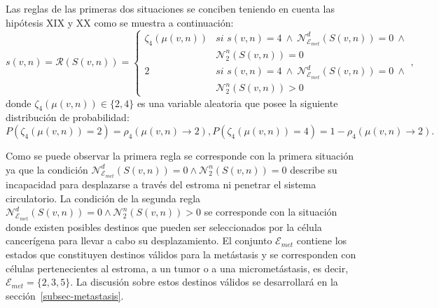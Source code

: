 Las reglas de las primeras dos situaciones se conciben teniendo en cuenta las hip\'otesis XIX y XX como se muestra a continuaci\'on:
\begin{equation}
s(v,n)=\mathcal{R}(S(v,n))=\left\lbrace
	\begin{array}{cl}
		\zeta_4(\mu(v,n)) & \textit{si } s(v,n)=4~\wedge~\mathcal{N}_{\mathcal{E}_{met}}^d(S(v,n))=0~\wedge\\
				          & \mathcal{N}_2^n(S(v,n))=0\\
		2& \textit{si } s(v,n)=4~\wedge~\mathcal{N}_{\mathcal{E}_{met}}^d(S(v,n))=0~\wedge\\
		 & \mathcal{N}_2^n(S(v,n))>0		
	\end{array}
\right., \label{eq-aparition}
\end{equation}
donde $\zeta_4(\mu(v,n)) \in \lbrace 2,4 \rbrace$ es una variable aleatoria que posee la siguiente distribuci\'on de probabilidad:
\begin{subequations}
\begin{equation}
P(\zeta_4(\mu(v,n))=2) = \rho_4(\mu(v,n) \rightarrow 2),
\end{equation}
\begin{equation}
P(\zeta_4(\mu(v,n))=4) = 1 - \rho_4(\mu(v,n) \rightarrow 2).
\end{equation}
\end{subequations}

Como se puede observar la primera regla se corresponde con la primera situaci\'on ya que la condici\'on $\mathcal{N}_{\mathcal{E}_{met}}^d(S(v,n))=0 \wedge \mathcal{N}_2^n(S(v,n))=0$ describe su incapacidad para desplazarse a trav\'es del estroma ni penetrar el sistema circulatorio. La condici\'on de la segunda regla $\mathcal{N}_{\mathcal{E}_{met}}^d(S(v,n))=0 \wedge \mathcal{N}_2^n(S(v,n))>0$ se corresponde con la situaci\'on donde existen posibles destinos que pueden ser seleccionados por la c\'elula cancer\'igena para llevar a cabo su desplazamiento. El conjunto ${\mathcal{E}_{met}}$ contiene los estados que constituyen destinos v\'alidos para la met\'astasis y se corresponden con c\'elulas pertenecientes al estroma, a un tumor o a una micromet\'astasis, es decir, ${\mathcal{E}_{met}} = \lbrace 2,3,5 \rbrace$. La discusi\'on sobre estos destinos v\'alidos se desarrollar\'a en la secci\'on~\ref{subsec-metastasis}. 

